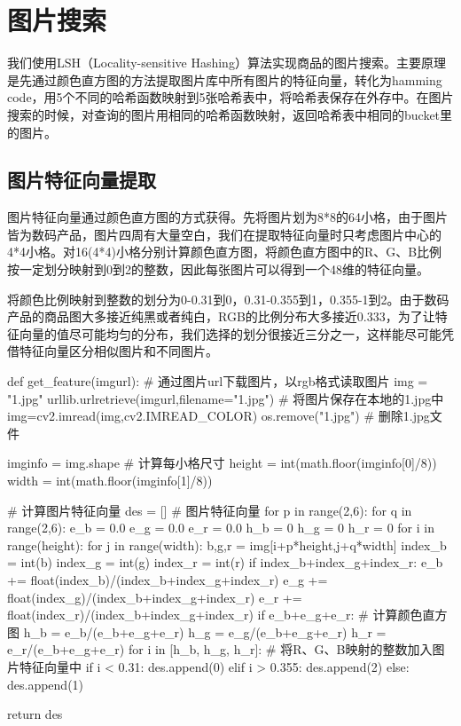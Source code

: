 \section{图片搜索}

我们使用LSH（Locality-sensitive Hashing）算法实现商品的图片搜索。主要原理是先通过颜色直方图的方法提取图片库中所有图片的特征向量，转化为hamming code，用5个不同的哈希函数映射到5张哈希表中，将哈希表保存在外存中。在图片搜索的时候，对查询的图片用相同的哈希函数映射，返回哈希表中相同的bucket里的图片。

\subsection{图片特征向量提取}

图片特征向量通过颜色直方图的方式获得。先将图片划为8*8的64小格，由于图片皆为数码产品，图片四周有大量空白，我们在提取特征向量时只考虑图片中心的4*4小格。对16(4*4)小格分别计算颜色直方图，将颜色直方图中的R、G、B比例按一定划分映射到0到2的整数，因此每张图片可以得到一个48维的特征向量。

将颜色比例映射到整数的划分为0-0.31到0，0.31-0.355到1，0.355-1到2。由于数码产品的商品图大多接近纯黑或者纯白，RGB的比例分布大多接近0.333，为了让特征向量的值尽可能均匀的分布，我们选择的划分很接近三分之一，这样能尽可能凭借特征向量区分相似图片和不同图片。

\begin{python}
def get_feature(imgurl):
    # 通过图片url下载图片，以rgb格式读取图片
    img = "1.jpg"
    urllib.urlretrieve(imgurl,filename="1.jpg") # 将图片保存在本地的1.jpg中
    img=cv2.imread(img,cv2.IMREAD_COLOR)
    os.remove("1.jpg") # 删除1.jpg文件

    imginfo = img.shape # 计算每小格尺寸
    height = int(math.floor(imginfo[0]/8))
    width = int(math.floor(imginfo[1]/8))

    # 计算图片特征向量
    des = [] # 图片特征向量
    for p in range(2,6):
        for q in range(2,6):
            e_b = 0.0
            e_g = 0.0
            e_r = 0.0
            h_b = 0
            h_g = 0
            h_r = 0
            for i in range(height):
                for j in range(width):
                    b,g,r = img[i+p*height,j+q*width]
                    index_b = int(b)
                    index_g = int(g)
                    index_r = int(r)
                    if index_b+index_g+index_r:
                        e_b += float(index_b)/(index_b+index_g+index_r)
                        e_g += float(index_g)/(index_b+index_g+index_r)
                        e_r += float(index_r)/(index_b+index_g+index_r)
            if e_b+e_g+e_r: # 计算颜色直方图
                h_b = e_b/(e_b+e_g+e_r)
                h_g = e_g/(e_b+e_g+e_r)
                h_r = e_r/(e_b+e_g+e_r)
            for i in [h_b, h_g, h_r]: # 将R、G、B映射的整数加入图片特征向量中
                if i < 0.31:
                    des.append(0)
                elif i > 0.355:
                    des.append(2)
                else:
                    des.append(1)

    return des
\end{python}

